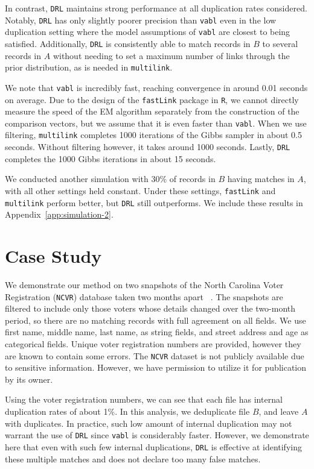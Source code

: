 \documentclass[12pt,letterpaper]{article}
\newcommand{\1}[1]{\mathbb{I}\!\left[#1\right]} %
\begin{document}
In contrast, \texttt{DRL} maintains strong performance at all duplication rates considered. Notably, \texttt{DRL} has only slightly poorer precision than \texttt{vabl} even in the low duplication setting where the model assumptions of \texttt{vabl} are closest to being satisfied. Additionally, \texttt{DRL} is consistently able to match records in $B$ to several records in $A$ without needing to set a maximum number of links through the prior distribution, as is needed in \texttt{multilink}. 

We note that \texttt{vabl} is incredibly fast, reaching convergence in around 0.01 seconds on average. Due to the design of the \texttt{fastLink} package in \texttt{R}, we cannot directly measure the speed of the EM algorithm separately from the construction of the comparison vectors, but we assume that it is even faster than \texttt{vabl}. When we use filtering, \texttt{multilink} completes 1000 iterations of the Gibbs sampler in about 0.5 seconds. Without filtering however, it takes around 1000 seconds. Lastly, \texttt{DRL} completes the 1000 Gibbs iterations in about 15 seconds. 

We conducted another simulation with 30\% of records in $B$ having matches in $A$, with all other settings held constant. Under these settings, \texttt{fastLink} and \texttt{multilink} perform better, but \texttt{DRL} still outperforms. We include these results in Appendix~\ref{app:simulation-2}.

\section{Case Study}\label{sec:case-study}

We demonstrate our method on two snapshots of the North Carolina Voter Registration (\texttt{NCVR}) database taken two months apart ~\citep{christen_preparation_2014}. The snapshots are filtered to include only those voters whose details changed over the two-month period, so there are no matching records with full agreement on all fields. We use first name, middle name, last name, as string fields, and street address and age as categorical fields. Unique voter registration numbers are provided, however they are known to contain some errors. The \texttt{NCVR} dataset is not publicly available due to sensitive information. However, we have permission to utilize it for publication by its owner.

Using the voter registration numbers, we can see that each file has internal duplication rates of about 1\%. In this analysis, we deduplicate file $B$, and leave $A$ with duplicates. In practice, such low amount of internal duplication may not warrant the use of \texttt{DRL} since \texttt{vabl} is considerably faster. However, we demonstrate here that even with such few internal duplications, \texttt{DRL} is effective at identifying these multiple matches and does not declare too many false matches. 
\end{document}

